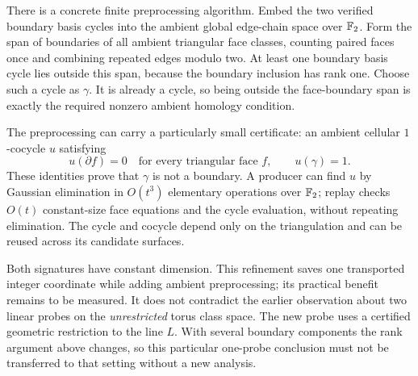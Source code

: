 There is a concrete finite preprocessing algorithm. Embed the two verified
boundary basis cycles into the ambient global edge-chain space over $\mathbb F_2$.
Form the span of boundaries of all ambient triangular face classes, counting
paired faces once and combining repeated edges modulo two. At least one
boundary basis cycle lies outside this span, because the boundary inclusion
has rank one. Choose such a cycle as $\gamma$. It is already a cycle, so
being outside the face-boundary span is exactly the required nonzero ambient
homology condition.

The preprocessing can carry a particularly small certificate: an ambient
cellular $1$-cocycle $u$ satisfying
\[
 u(\partial f)=0\quad\text{for every triangular face }f,
 \qquad u(\gamma)=1.
\]
These identities prove that $\gamma$ is not a boundary. A producer can find
$u$ by Gaussian elimination in $O(t^3)$ elementary operations over $\mathbb F_2$;
replay checks $O(t)$ constant-size face equations and the cycle evaluation,
without repeating elimination. The cycle and cocycle depend only on the
triangulation and can be reused across its candidate surfaces.

Both signatures have constant dimension. This refinement saves one
transported integer coordinate while adding ambient preprocessing; its practical benefit remains to be measured. It
does not contradict the earlier observation about two linear probes on the
\emph{unrestricted} torus class space. The new probe uses a certified
geometric restriction to the line $L$. With several boundary components the
rank argument above changes, so this particular one-probe conclusion must
not be transferred to that setting without a new analysis.
